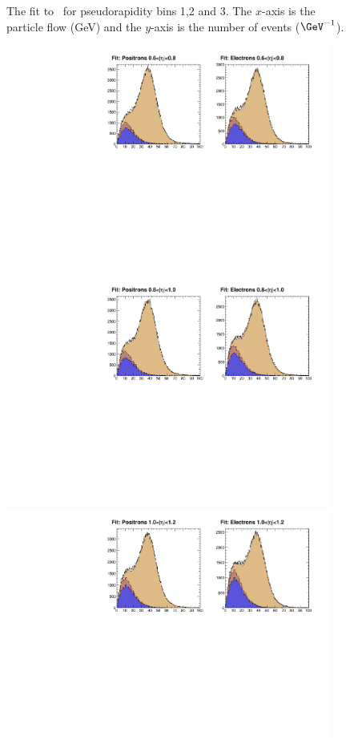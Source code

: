\begin{figure}
\begin{center}
\caption{  \label{fig:data1} The fit to \MET\ for pseudorapidity bins 1,2 and
3.  The $x$-axis is the particle flow \ETm (GeV) and the $y$-axis is the number
of events ($\GeV^{-1}$).}
\end{center}
\end{figure}

\begin{figure}
\begin{center}
\includegraphics[width=0.95\textwidth]{data_3.pdf} \\
\includegraphics[width=0.95\textwidth]{data_4.pdf} \\
\includegraphics[width=0.95\textwidth]{data_5.pdf}

\end{center}
\end{figure}
